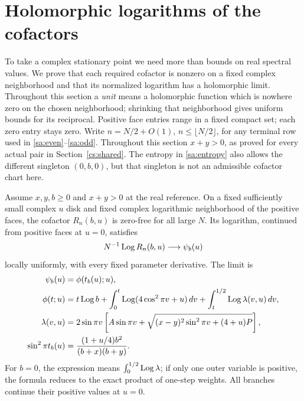 \section{Holomorphic logarithms of the cofactors}\label{sa:packets}
To take a complex stationary point we need more than bounds on real
spectral values. We prove that each required cofactor is nonzero on
a fixed complex neighborhood and that its normalized logarithm has
a holomorphic limit. Throughout this section a \emph{unit} means a
holomorphic function which is nowhere zero on the chosen neighborhood;
shrinking that neighborhood gives uniform bounds for its reciprocal. Positive face entries range in a
fixed compact set; each zero entry stays zero. Write $n=N/2+O(1)$,
$n\le\lfloor N/2\rfloor$, for any terminal row used in
\eqref{sa:even}--\eqref{sa:odd}.
Throughout this section $x+y>0$, as proved for every actual pair in
Section~\ref{cs:shared}. The entropy in \eqref{sa:entropy} also allows the different
singleton $(0,b,0)$, but that singleton is not an admissible cofactor
chart here.

\begin{proposition}\label{sa:local-log}
Assume $x,y,b\ge0$ and $x+y>0$ at the real reference.
On a fixed sufficiently small complex $u$ disk and fixed complex
logarithmic neighborhood of the positive faces, the cofactor
$R_n(b,u)$ is zero-free for all large $N$. Its logarithm, continued
from positive faces at $u=0$, satisfies
\begin{equation}\label{sa:log-limit}
 N^{-1}\operatorname{Log} R_n(b,u)\longrightarrow\psi_b(u)
\end{equation}
locally uniformly, with every fixed parameter derivative. The limit is
\begin{align}
 \psi_b(u)&=\phi(t_b(u);u),\notag\\
 \phi(t;u)&=t\operatorname{Log} b+\int_0^t\operatorname{Log}(4\cos^2\pi v+u)\,dv
                         +\int_t^{1/2}\operatorname{Log}\lambda(v,u)\,dv,
                                                       \label{sa:phase}\\
 \lambda(v,u)&=2\sin\pi v\left[A\sin\pi v+
       \sqrt{(x-y)^2\sin^2\pi v+(4+u)P}\right],\notag\\
 \sin^2\pi t_b(u)&=\frac{(1+u/4)b^2}{(b+x)(b+y)}.\notag
\end{align}
For $b=0$, the expression means $\int_0^{1/2}\operatorname{Log}\lambda$;
if only one outer variable is positive, the formula reduces to the exact product of one-step weights.
All branches continue their positive values at $u=0$.
\end{proposition}

